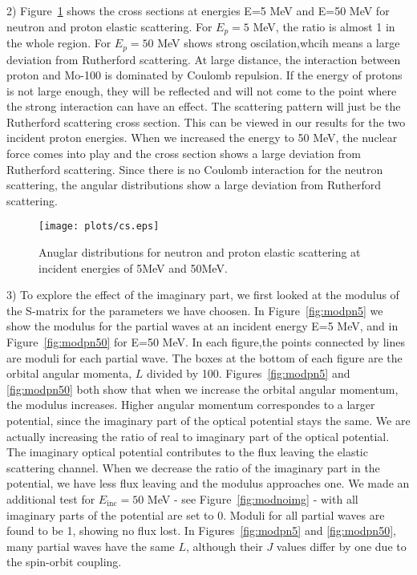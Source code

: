 \documentclass[]{scrartcl}
\begin{document}
2) Figure~\ref{fig:xsproton} shows the cross sections at energies E=5 MeV and E=50 MeV for neutron and proton elastic scattering. For $E_p=5$ MeV, the ratio is almost 1 in the whole region. For $E_p=50$ MeV shows strong oscilation,whcih means a large deviation from Rutherford scattering. At large distance, the interaction between proton and Mo-100 is dominated by Coulomb repulsion. If the energy of protons is not large enough, they will be reflected and will not come to the point where the strong interaction can have an effect. The scattering pattern will just be the Rutherford scattering cross section. This can be viewed in our results for the two incident proton energies. When we increased the energy to 50 MeV, the nuclear force comes into play and the cross section shows a large deviation from Rutherford scattering. Since there is no Coulomb interaction for the neutron scattering, the angular distributions show a large deviation from Rutherford scattering.

\begin{figure}[!htb]
\centering
\texttt{[image: plots/cs.eps]}
\caption{Anuglar distributions for neutron and proton elastic scattering at incident energies of 5MeV and 50MeV.}
\label{fig:xsproton}
\end{figure}


3) To explore the effect of the imaginary part, we first looked at the modulus of the S-matrix for the parameters we have choosen. In Figure~\ref{fig:modpn5} we show the modulus for the partial waves at an incident energy E=5 MeV, and in Figure~\ref{fig:modpn50} for E=50 MeV. In each figure,the points connected by lines are moduli for each partial wave. The boxes at the bottom of each figure are the orbital angular momenta, $L$ divided by 100. Figures~\ref{fig:modpn5} and \ref{fig:modpn50} both show that when we increase the orbital angular momentum, the modulus increases. Higher angular momentum correspondes to a larger potential, since the imaginary part of the optical potential stays the same. We are actually increasing the ratio of real to imaginary part of the optical potential. The imaginary optical potential contributes to the flux leaving the elastic scattering channel. When we decrease the ratio of the imaginary part in the potential, we have less flux leaving and the modulus approaches one. We made an additional test for $E_{\mathrm{inc}}=50$ MeV - see Figure~\ref{fig:modnoimg} - with all imaginary parts of the potential are set to 0. Moduli for all partial waves are found to be 1, showing no flux lost. In Figures~\ref{fig:modpn5} and \ref{fig:modpn50}, many partial waves have the same $L$, although their $J$ values differ by one due to the spin-orbit coupling.
\end{document}

